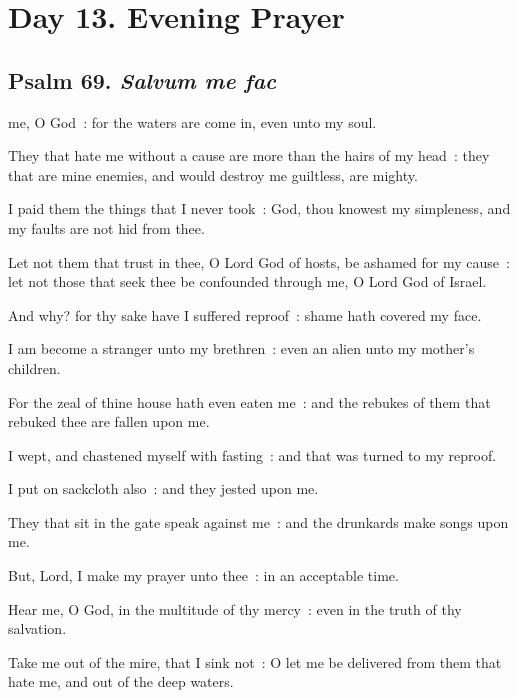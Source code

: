 \section*{Day 13. Evening Prayer}

\subsection{Psalm 69. \textit{Salvum me fac}}

 me, O God~: for the waters are come in, even unto my soul.\par
{}
They that hate me without a cause are more than the hairs of my head~: they that are mine enemies, and would destroy me guiltless, are mighty.\par
{}I paid them the things that I never took~: God, thou knowest my simpleness, and my faults are not hid from thee.\par
{}Let not them that trust in thee, O Lord God of hosts, be ashamed for my cause~: let not those that seek thee be confounded through me, O Lord God of Israel.\par
{}And why? for thy sake have I suffered reproof~: shame hath covered my face.\par
{}I am become a stranger unto my brethren~: even an alien unto my mother's children.\par
{}For the zeal of thine house hath even eaten me~: and the rebukes of them that rebuked thee are fallen upon me.\par
{}I wept, and chastened myself with fasting~: and that was turned to my reproof.\par
{}I put on sackcloth also~: and they jested upon me.\par
{}They that sit in the gate speak against me~: and the drunkards make songs upon me.\par
{}But, Lord, I make my prayer unto thee~: in an acceptable time.\par
{}Hear me, O God, in the multitude of thy mercy~: even in the truth of thy salvation.\par
{}Take me out of the mire, that I sink not~: O let me be delivered from them that hate me, and out of the deep waters.\par
